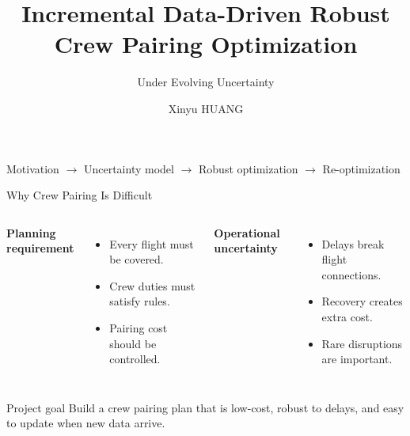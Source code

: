 \documentclass[aspectratio=169]{beamer}
\title[Robust Crew Pairing]{Incremental Data-Driven Robust Crew Pairing Optimization}
\subtitle{Under Evolving Uncertainty}
\author{Xinyu HUANG}
\institute{The Hong Kong Polytechnic University}
\date{}
\begin{document}
\begin{frame}
  \titlepage
  \vspace{-0.35cm}
  \begin{center}
    \small Motivation $\rightarrow$ Uncertainty model $\rightarrow$ Robust optimization $\rightarrow$ Re-optimization
  \end{center}
\end{frame}

\begin{frame}{Why Crew Pairing Is Difficult}
  \begin{columns}[T,onlytextwidth]
      \textbf{Planning requirement}
      \begin{itemize}
        \item Every flight must be covered.
        \item Crew duties must satisfy rules.
        \item Pairing cost should be controlled.
      \end{itemize}

      \textbf{Operational uncertainty}
      \begin{itemize}
        \item Delays break flight connections.
        \item Recovery creates extra cost.
        \item Rare disruptions are important.
      \end{itemize}
  \end{columns}

  \vspace{0.45cm}
  \begin{block}{Project goal}
    Build a crew pairing plan that is low-cost, robust to delays, and easy to update when new data arrive.
  \end{block}
\end{frame}
\end{document}
